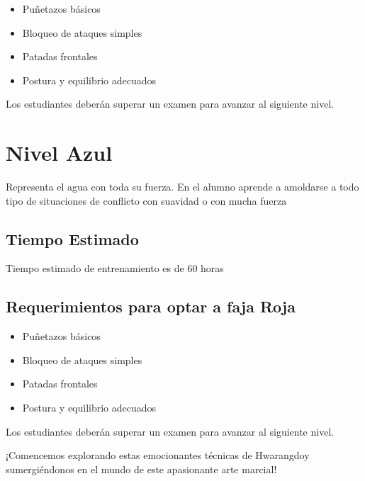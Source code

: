 \begin{itemize}
	\item Puñetazos básicos
	\item Bloqueo de ataques simples
	\item Patadas frontales
	\item Postura y equilibrio adecuados
\end{itemize}

Los estudiantes deberán superar un examen para avanzar al siguiente nivel.

\section{Nivel Azul}

Representa el agua con toda su fuerza. En el alumno aprende a amoldarse a todo tipo de situaciones de conflicto con suavidad o con mucha fuerza

\subsection[Duración]{Tiempo Estimado}

Tiempo estimado de entrenamiento es de 60 horas

\subsection{Requerimientos para optar a faja Roja}

\begin{itemize}
	\item Puñetazos básicos
	\item Bloqueo de ataques simples
	\item Patadas frontales
	\item Postura y equilibrio adecuados
\end{itemize}

Los estudiantes deberán superar un examen para avanzar al siguiente nivel.




¡Comencemos explorando estas emocionantes técnicas de Hwarangdo\textregistered y sumergiéndonos en el mundo de este apasionante arte marcial!